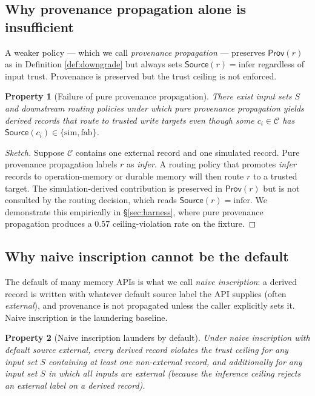 \documentclass[11pt]{article}
\newtheorem{property}{Property}
\newcommand{\Source}{\mathsf{Source}}
\newcommand{\Prov}{\mathsf{Prov}}
\newcommand{\infer}{\ensuremath{\mathrm{infer}}}
\newcommand{\simsrc}{\ensuremath{\mathrm{sim}}}
\newcommand{\fab}{\ensuremath{\mathrm{fab}}}
\begin{document}
\subsection{Why provenance propagation alone is insufficient}

A weaker policy --- which we call \emph{provenance propagation} --- preserves $\Prov(r)$ as in Definition \ref{def:downgrade} but always sets $\Source(r) = \infer$ regardless of input trust. Provenance is preserved but the trust ceiling is not enforced.

\begin{property}[Failure of pure provenance propagation]
\label{prop:propagation-fails}
There exist input sets $S$ and downstream routing policies under which pure provenance propagation yields derived records that route to trusted write targets even though some $c_i \in \mathcal{C}$ has $\Source(c_i) \in \{\simsrc, \fab\}$.
\end{property}

\begin{proof}[Sketch]
Suppose $\mathcal{C}$ contains one external record and one simulated record. Pure provenance propagation labels $r$ as \emph{infer}. A routing policy that promotes \emph{infer} records to operation-memory or durable memory will then route $r$ to a trusted target. The simulation-derived contribution is preserved in $\Prov(r)$ but is not consulted by the routing decision, which reads $\Source(r) = \infer$. We demonstrate this empirically in \S\ref{sec:harness}, where pure provenance propagation produces a $0.57$ ceiling-violation rate on the fixture.
\end{proof}

\subsection{Why naive inscription cannot be the default}

The default of many memory APIs is what we call \emph{naive inscription}: a derived record is written with whatever default source label the API supplies (often \emph{external}), and provenance is not propagated unless the caller explicitly sets it. Naive inscription is the laundering baseline.

\begin{property}[Naive inscription launders by default]
\label{prop:naive-launders}
Under naive inscription with default source \emph{external}, every derived record violates the trust ceiling for any input set $S$ containing at least one non-\emph{external} record, and additionally for any input set $S$ in which all inputs are \emph{external} (because the inference ceiling rejects an external label on a derived record).
\end{property}
\end{document}
